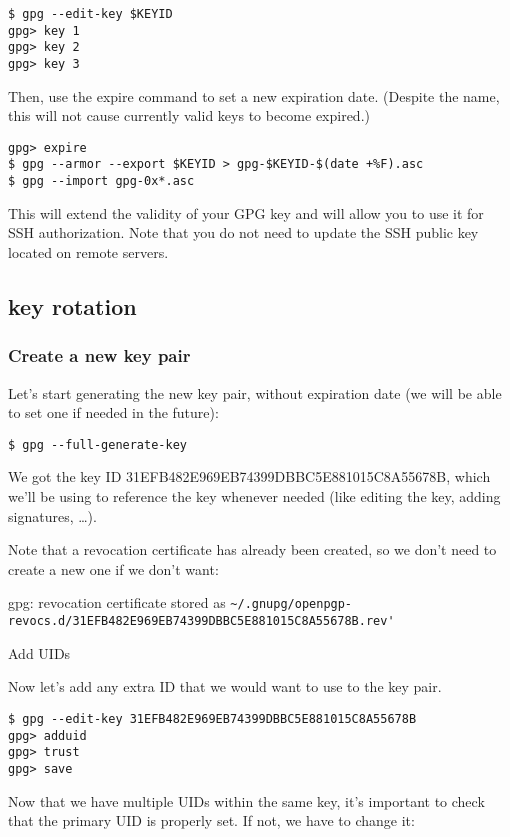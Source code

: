 \begin{verbatim}
$ gpg --edit-key $KEYID
gpg> key 1
gpg> key 2
gpg> key 3
\end{verbatim}

Then, use the expire command to set a new expiration date.  (Despite the name, this will not cause currently valid keys to become expired.)

\begin{verbatim}
gpg> expire
$ gpg --armor --export $KEYID > gpg-$KEYID-$(date +%F).asc
$ gpg --import gpg-0x*.asc
\end{verbatim}

This will extend the validity of your GPG key and will allow you to use it for
SSH authorization.  Note that you do not need to update the SSH public key
located on remote servers.

\subsection{key rotation}

\subsubsection{Create a new key pair}

Let’s start generating the new key pair, without expiration date (we will be able to set one if needed in the future):

\begin{verbatim}
$ gpg --full-generate-key
\end{verbatim}

We got the key ID 31EFB482E969EB74399DBBC5E881015C8A55678B, which we’ll be using to reference the key whenever needed (like editing the key, adding signatures, …).

Note that a revocation certificate has already been created, so we don’t need to create a new one if we don’t want:

gpg: revocation certificate stored as
\verb+~/.gnupg/openpgp-revocs.d/31EFB482E969EB74399DBBC5E881015C8A55678B.rev'+

Add UIDs

Now let’s add any extra ID that we would want to use to the key pair. 

\begin{verbatim}
$ gpg --edit-key 31EFB482E969EB74399DBBC5E881015C8A55678B
gpg> adduid
gpg> trust
gpg> save
\end{verbatim}

Now that we have multiple UIDs within the same key, it’s important to check that the primary UID is properly set. If not, we have to change it:

